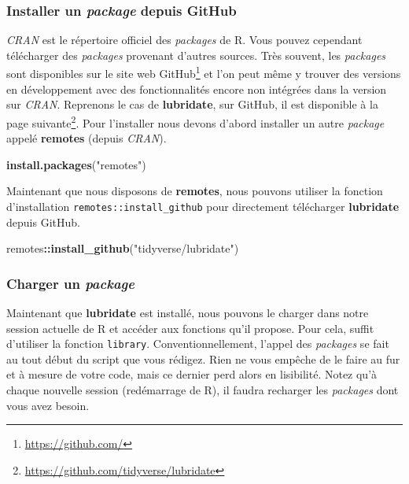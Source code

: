 \documentclass[
  11pt,
  french,
]{book}
\makeatletter
\newenvironment{Shaded}{\begin{snugshade}}{\end{snugshade}}
\newcommand{\KeywordTok}[1]{\textcolor[rgb]{0.13,0.29,0.53}{\textbf{#1}}}
\newcommand{\NormalTok}[1]{#1}
\newcommand{\OperatorTok}[1]{\textcolor[rgb]{0.81,0.36,0.00}{\textbf{#1}}}
\newcommand{\StringTok}[1]{\textcolor[rgb]{0.31,0.60,0.02}{#1}}
\renewcommand{\href}[2]{#2\footnote{\url{#1}}}
\newenvironment{kframe}{%
\medskip{}
\setlength{\fboxsep}{.8em}
 \def\at@end@of@kframe{}%
 \ifinner\ifhmode%
  \def\at@end@of@kframe{\end{minipage}}%
  \begin{minipage}{\columnwidth}%
 \fi\fi%
 \def\FrameCommand##1{\hskip\@totalleftmargin \hskip-\fboxsep
 \colorbox{shadecolor}{##1}\hskip-\fboxsep
     \hskip-\linewidth \hskip-\@totalleftmargin \hskip\columnwidth}%
 \MakeFramed {\advance\hsize-\width
   \@totalleftmargin\z@ \linewidth\hsize
   \@setminipage}}%
 {\par\unskip\endMakeFramed%
 \at@end@of@kframe}
\renewenvironment{Shaded}{\begin{kframe}}{\end{kframe}}
\makeatother
\begin{document}
\hypertarget{sect01232}{%
\subsubsection{\texorpdfstring{Installer un \emph{package} depuis GitHub}{Installer un package depuis GitHub}}\label{sect01232}}

\emph{CRAN} est le répertoire officiel des \emph{packages} de R. Vous pouvez cependant télécharger des \emph{packages} provenant d'autres sources. Très souvent, les \emph{packages} sont disponibles sur le site web \href{https://github.com/}{GitHub} et l'on peut même y trouver des versions en développement avec des fonctionnalités encore non intégrées dans la version sur \emph{CRAN}. Reprenons le cas de \textbf{lubridate}, sur GitHub, il est disponible à la page \href{https://github.com/tidyverse/lubridate}{suivante}. Pour l'installer nous devons d'abord installer un autre \emph{package} appelé \textbf{remotes} (depuis \emph{CRAN}).

\begin{Shaded}
\begin{Highlighting}[]
\KeywordTok{install.packages}\NormalTok{(}\StringTok{"remotes"}\NormalTok{)}
\end{Highlighting}
\end{Shaded}

Maintenant que nous disposons de \textbf{remotes}, nous pouvons utiliser la fonction d'installation \texttt{remotes::install\_github} pour directement télécharger \textbf{lubridate} depuis GitHub.

\begin{Shaded}
\begin{Highlighting}[]
\NormalTok{remotes}\OperatorTok{::}\KeywordTok{install_github}\NormalTok{(}\StringTok{"tidyverse/lubridate"}\NormalTok{)}
\end{Highlighting}
\end{Shaded}

\hypertarget{sect01233}{%
\subsubsection{\texorpdfstring{Charger un \emph{package}}{Charger un package}}\label{sect01233}}

Maintenant que \textbf{lubridate} est installé, nous pouvons le charger dans notre session actuelle de R et accéder aux fonctions qu'il propose. Pour cela, suffit d'utiliser la fonction \texttt{library}. Conventionnellement, l'appel des \emph{packages} se fait au tout début du script que vous rédigez. Rien ne vous empêche de le faire au fur et à mesure de votre code, mais ce dernier perd alors en lisibilité. Notez qu'à chaque nouvelle session (redémarrage de R), il faudra recharger les \emph{packages} dont vous avez besoin.
\end{document}
